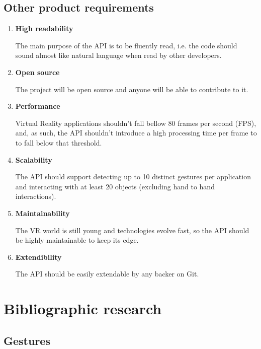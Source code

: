\documentclass[12pt,a4paper,twoside]{report}
\begin{document}
\section{Other product requirements}

\begin{enumerate}
  \item \textbf{High readability}
    
    The main purpose of the API is to be fluently read, i.e. the code should sound almost like natural language when read by other developers.

  \item \textbf{Open source}
  
    The project will be open source and anyone will be able to contribute to it.

  \item \textbf{Performance}

    Virtual Reality applications shouldn’t fall bellow 80 frames per second (FPS), and, as such, the API shouldn’t introduce a high processing time per frame to to fall below that threshold.

  \item \textbf{Scalability}
    
    The API should support detecting up to 10 distinct gestures per application and interacting with at least 20 objects (excluding hand to hand interactions).

  \item \textbf{Maintainability}

    The VR world is still young and technologies evolve fast, so the API should be highly maintainable to keep its edge.

  \item \textbf{Extendibility}
    
    The API should be easily extendable by any backer on Git.

\end{enumerate}

\chapter{Bibliographic research}

\section{Gestures}
\end{document}
